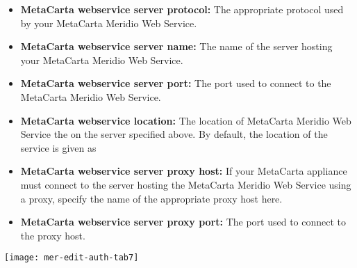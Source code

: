 \begin{itemize}

\item \textbf{MetaCarta webservice server protocol:}  The appropriate protocol used by your MetaCarta Meridio Web Service.

\item \textbf{MetaCarta webservice server name:}  The name of the server hosting your MetaCarta Meridio Web Service.

\item \textbf{MetaCarta webservice server port:}  The port used to connect to the MetaCarta Meridio Web Service.

\item \textbf{MetaCarta webservice location:}  The location of MetaCarta Meridio Web Service the on the server specified above. By default, the location of the service is given as 

\item \textbf{MetaCarta webservice server proxy host:}  If your MetaCarta appliance must connect to the server hosting the MetaCarta Meridio Web Service using a proxy, specify the name of the appropriate proxy host here.

\item \textbf{MetaCarta webservice server proxy port:}  The port used to connect to the proxy host.

\end{itemize}



\texttt{[image: mer-edit-auth-tab7]}

